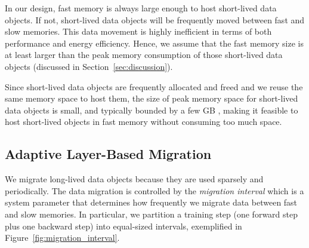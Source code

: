 In our design, fast memory is always large enough to host short-lived data objects. If not, short-lived data objects will be frequently moved between fast and slow memories. This data movement is highly inefficient in terms of both performance and energy efficiency. %
Hence, we assume that the fast memory size is at least larger than the peak memory consumption of those short-lived data objects (discussed in Section~\ref{sec:discussion}). 

Since short-lived data objects are frequently allocated and freed and we reuse the same memory space to host them, the size of peak memory space for short-lived data objects is small, and typically bounded by a few GB
\textcolor{check}{, making it feasible to host short-lived objects in fast memory without consuming too much space}. 

\vspace{-7pt}
\subsection{\textcolor{check}{Adaptive Layer-Based Migration}}
\label{sec:adaptive_dm}


We migrate long-lived data objects 
\textcolor{check}{because they are used sparsely and periodically}. %
The data migration is controlled by the \textit{migration interval} \textcolor{check}{which is a system parameter that} determines how frequently we migrate data between fast and slow memories. %
\textcolor{check}{In particular, we partition a training step (one forward step plus one backward step) into equal-sized intervals, exemplified in Figure~\ref{fig:migration_interval}.}

